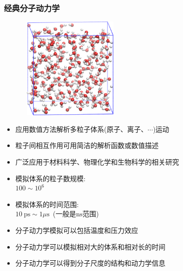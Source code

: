 \frame
{
	\frametitle{经典分子动力学}
\begin{minipage}{0.45\textwidth}
\begin{figure}[h!]
\centering
\vspace{-3.0pt}
\includegraphics[height=2.00in,width=2.00in,viewport=0 0 135 135,clip]{Figures/Unit_Cell_of_Liquid_Water.png}
\label{Unit_Cell_of_Liquid_Water}
\end{figure}
\end{minipage}
\begin{minipage}{0.53\textwidth}
	\begin{itemize}
		\item 应用数值方法解析多粒子体系(原子、离子、$\cdots$)运动
		\item 粒子间相互作用可用简洁的解析函数或数值描述
		\item 广泛应用于材料科学、物理化学和生物科学的相关研究
		\item 模拟体系的粒子数规模:~\\$100\sim10^6$
		\item 模拟体系的时间范围:~\\$10~\mathrm{ps}\sim1\mu\mathrm{s}$~(一般是$\mathrm{ns}$范围)
	\end{itemize}
\end{minipage}
\begin{itemize}
	\item 分子动力学模拟可以包括温度和压力效应
	\item 分子动力学可以模拟相对大的体系和相对长的时间
	\item 分子动力学可以得到分子尺度的结构和动力学信息
\end{itemize}
}

